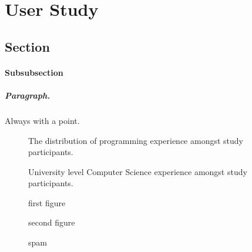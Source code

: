 \chapter{User Study}
\label{chap:userstudy}
\section{Section}
%
\subsubsection{Subsubsection}

\paragraph{Paragraph.} Always with a point.

\begin{figure}[H]
	\scalebox{0.75}{}
	\caption{The distribution of programming experience amongst study participants.}
	\label{fig:programmingexp}
\end{figure}

\begin{figure}[H]
	\scalebox{1}{}
	\caption{University level Computer Science experience amongst study participants.}
	\label{fig:uniexp}
\end{figure}

\begin{figure}[H]
	\centering
	\begin{minipage}{0.45\textwidth}
		\centering
		\scalebox{0.7}{}
		\caption{first figure}
    \end{minipage}\hspace{-1em}
	\begin{minipage}{0.45\textwidth}
		\centering
		\scalebox{0.7}{}
		\caption{second figure}
	\end{minipage}
\end{figure}



\begin{figure}[H]
	\scalebox{0.72}{}
	\caption{spam}
	\label{fig:uniexp}
\end{figure}


